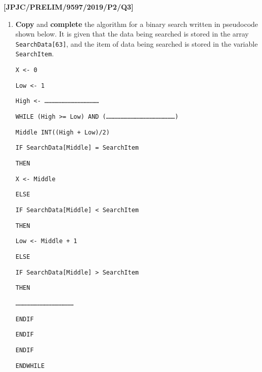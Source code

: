 \item \textbf{{[}JPJC/PRELIM/9597/2019/P2/Q3{]} }
\begin{enumerate}
\item \textbf{Copy} and \textbf{complete} the algorithm for a binary search
written in pseudocode shown below. It is given that the data being
searched is stored in the array \texttt{SearchData{[}63{]}}, and the
item of data being searched is stored in the variable \texttt{SearchItem}. 

\noindent %
\noindent\begin{minipage}[t]{1\columnwidth}%
\texttt{X <- 0 }

\texttt{Low <- 1 }

\texttt{High <- \dots \dots \dots \dots \dots \dots \dots \dots \dots \dots \dots \dots \dots \dots \dots{} }

\texttt{WHILE (High >= Low) AND (\dots \dots \dots \dots \dots \dots \dots \dots \dots \dots \dots \dots \dots \dots \dots \dots \dots \dots \dots )}

\texttt{\qquad{}Middle INT((High + Low)/2) }

\texttt{\qquad{}IF SearchData{[}Middle{]} = SearchItem }

\texttt{\qquad{}\qquad{}THEN }

\texttt{\qquad{}\qquad{}\qquad{}X <- Middle }

\texttt{\qquad{}\qquad{}ELSE}

\texttt{\qquad{}\qquad{}\qquad{}IF SearchData{[}Middle{]} < SearchItem }

\texttt{\qquad{}\qquad{}\qquad{}\qquad{}THEN}

\texttt{\qquad{}\qquad{}\qquad{}\qquad{}\qquad{}Low <- Middle
+ 1}

\texttt{\qquad{}\qquad{}\qquad{}\qquad{}ELSE }

\texttt{\qquad{}\qquad{}\qquad{}\qquad{}\qquad{}IF SearchData{[}Middle{]}
> SearchItem }

\texttt{\qquad{}\qquad{}\qquad{}\qquad{}\qquad{}\qquad{}THEN}

\texttt{\qquad{}\qquad{}\qquad{}\qquad{}\qquad{}\qquad{}\qquad{}\dots \dots \dots \dots \dots \dots \dots \dots \dots \dots \dots \dots \dots \dots \dots \dots{} }

\texttt{\qquad{}\qquad{}\qquad{}\qquad{}\qquad{}ENDIF }

\texttt{\qquad{}\qquad{}\qquad{}ENDIF }

\texttt{\qquad{}ENDIF }

\texttt{ENDWHILE }%
\end{minipage}


\end{enumerate}
